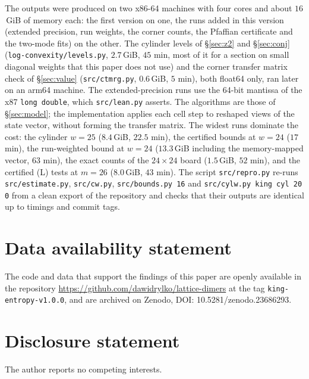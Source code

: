 \documentclass[11pt]{amsart}
\theoremstyle{definition}
\theoremstyle{remark}
\newcommand{\file}[1]{\texttt{#1}}
\begin{document}
The outputs were produced on two x86-64 machines with four cores and about $16$\,GiB of memory
each: the first version on one, the runs added in this version (extended precision, run weights,
the corner counts, the Pfaffian certificate and the two-mode fits) on the other. The cylinder levels
of \S\ref{sec:z2} and \S\ref{sec:conj} (\file{log-convexity/levels.py}, $2.7$\,GiB, $45$ min, most of it for a section on small diagonal
weights that this paper does not use) and the
corner transfer matrix check of \S\ref{sec:value} (\file{src/ctmrg.py}, $0.6$\,GiB, $5$ min), both
float64 only, ran later on an arm64 machine. The extended-precision
runs use the 64-bit mantissa of the x87 \texttt{long double}, which \file{src/lean.py} asserts. The
algorithms are those of \S\ref{sec:model}; the implementation applies each cell step to reshaped
views of the state vector, without forming the transfer matrix. The widest
runs dominate the cost: the cylinder $w = 25$ ($8.4$\,GiB, $22.5$ min), the certified bounds at
$w = 24$ ($17$ min), the run-weighted bound at $w = 24$ ($13.3$\,GiB including the memory-mapped vector, $63$ min), the exact counts of the
$24 \times 24$ board ($1.5$\,GiB, $52$ min), and the certified (L) tests at $m = 26$ ($8.0$\,GiB, $43$ min). The script
\file{src/repro.py} re-runs \texttt{src/estimate.py}, \texttt{src/cw.py}, \texttt{src/bounds.py 16} and
\texttt{src/cylw.py king cyl 20 0} from a clean export of the repository and
checks that their outputs are identical up to timings and commit tags.

\section*{Data availability statement}
The code and data that support the findings of this paper are openly available in the
repository \url{https://github.com/dawidrylko/lattice-dimers} at the tag
\texttt{king-entropy-v1.0.0}, and are archived on Zenodo,
DOI: 10.5281/zenodo.23686293.

\section*{Disclosure statement}
The author reports no competing interests.



\end{document}
